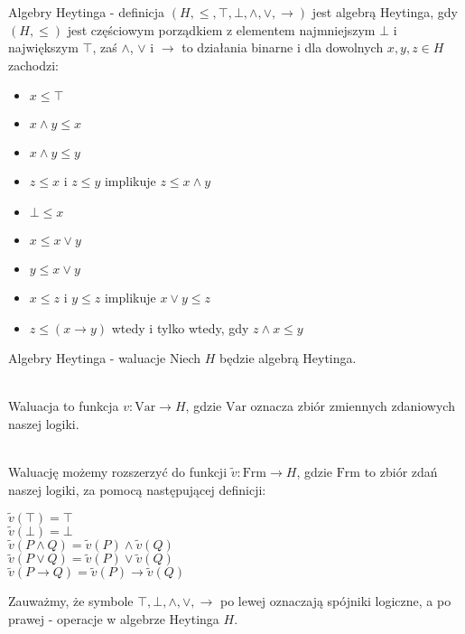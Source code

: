 \documentclass{beamer}
\newcommand{\impl}{\rightarrow}
\begin{document}
\begin{frame}{Algebry Heytinga - definicja}
$(H, \leq, \top, \bot, \land, \lor, \impl)$ jest algebrą Heytinga, gdy $(H, \leq)$ jest częściowym porządkiem z elementem najmniejszym $\bot$ i największym $\top$, zaś $\land$, $\lor$ i $\impl$ to działania binarne i dla dowolnych $x, y, z \in H$ zachodzi: \\
\begin{itemize}
	\item $x \leq \top$
	\item $x \land y \leq x$
	\item $x \land y \leq y$
	\item $z \leq x$ i $z \leq y$ implikuje $z \leq x \land y$
	\item $\bot \leq x$
	\item $x \leq x \lor y$
	\item $y \leq x \lor y$
	\item $x \leq z$ i $y \leq z$ implikuje $x \lor y \leq z$
	\item $z \leq (x \impl y)$ wtedy i tylko wtedy, gdy $z \land x \leq y$
\end{itemize}
\end{frame}

\begin{frame}{Algebry Heytinga - waluacje}
Niech $H$ będzie algebrą Heytinga. \\~\

Waluacja to funkcja $v : \text{Var} \to H$, gdzie $\text{Var}$ oznacza zbiór zmiennych zdaniowych naszej logiki. \\~\

Waluację możemy rozszerzyć do funkcji $\tilde{v}: \text{Frm} \to H$, gdzie $\text{Frm}$ to zbiór zdań naszej logiki, za pomocą następującej definicji: \\
\begin{center}
$\tilde{v}(\top) = \top$ \\
$\tilde{v}(\bot) = \bot$ \\
$\tilde{v}(P \land Q) = \tilde{v}(P) \land \tilde{v}(Q)$ \\
$\tilde{v}(P \lor Q) = \tilde{v}(P) \lor \tilde{v}(Q)$ \\
$\tilde{v}(P \impl Q) = \tilde{v}(P) \impl \tilde{v}(Q)$ \\
\end{center}

Zauważmy, że symbole $\top, \bot, \land, \lor, \impl$ po lewej oznaczają spójniki logiczne, a po prawej - operacje w algebrze Heytinga $H$.
\end{frame}
\end{document}
